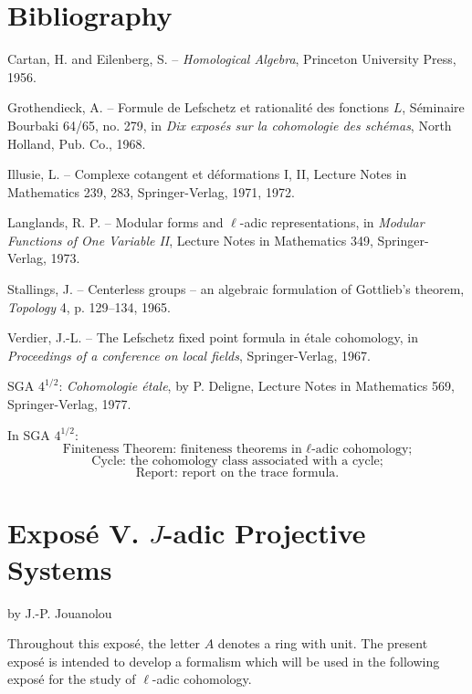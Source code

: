 \section*{Bibliography}

\begin{enumerate}[label={[\arabic*]}]
\item Cartan, H. and Eilenberg, S. -- \textit{Homological Algebra}, Princeton University Press, 1956.
\item Grothendieck, A. -- Formule de Lefschetz et rationalité des fonctions $L$, Séminaire Bourbaki 64/65, no. 279, in \textit{Dix exposés sur la cohomologie des schémas}, North Holland, Pub. Co., 1968.
\item Illusie, L. -- Complexe cotangent et déformations I, II, Lecture Notes in Mathematics 239, 283, Springer-Verlag, 1971, 1972.
\item Langlands, R. P. -- Modular forms and $\ell$-adic representations, in \textit{Modular Functions of One Variable II}, Lecture Notes in Mathematics 349, Springer-Verlag, 1973.
\item Stallings, J. -- Centerless groups -- an algebraic formulation of Gottlieb's theorem, \textit{Topology} 4, p. 129--134, 1965.
\item Verdier, J.-L. -- The Lefschetz fixed point formula in étale cohomology, in \textit{Proceedings of a conference on local fields}, Springer-Verlag, 1967.
\end{enumerate}

SGA $4^{1/2}$: \textit{Cohomologie étale}, by P. Deligne, Lecture Notes in Mathematics 569, Springer-Verlag, 1977.

In SGA $4^{1/2}$:
\[
\text{Finiteness Theorem: finiteness theorems in }\ell\text{-adic cohomology;}
\]
\[
\text{Cycle: the cohomology class associated with a cycle;}
\]
\[
\text{Report: report on the trace formula.}
\]


\section*{Exposé V. $J$-adic Projective Systems}
\begin{center}by J.-P. Jouanolou\end{center}

Throughout this exposé, the letter $A$ denotes a ring with unit. The present exposé is intended to develop a formalism which will be used in the following exposé for the study of $\ell$-adic cohomology.

